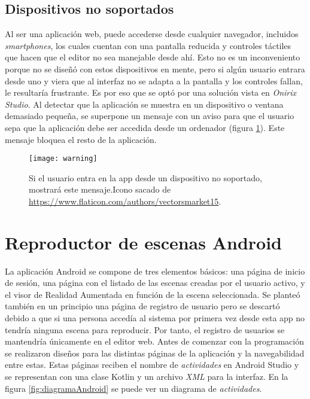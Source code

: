 \subsection{Dispositivos no soportados}

Al ser una aplicación web, puede accederse desde cualquier navegador, incluidos \textit{smartphones}, los cuales cuentan con una pantalla reducida y controles táctiles que hacen que el editor no sea manejable desde ahí. Esto no es un inconveniento porque no se diseñó con estos dispositivos en mente, pero si algún usuario entrara desde uno y viera que al interfaz no se adapta a la pantalla y los controles fallan, le resultaría frustrante. Es por eso que se optó por una solución vista en \textit{Onirix Studio}\cite{onirix}. Al detectar que la aplicación se muestra en un dispositivo o ventana demasiado pequeña, se superpone un mensaje con un aviso para que el usuario sepa que la aplicación debe ser accedida desde un ordenador (figura \ref{fig:warning}). Este mensaje bloquea el resto de la aplicación.

\begin{figure}[H]
    \centering
    \texttt{[image: warning]}
    \caption[Mensaje de advertencia para dispositvos no soportados]{Si el usuario entra en la app desde un dispositivo no soportado, mostrará este mensaje.Icono sacado de \url{https://www.flaticon.com/authors/vectorsmarket15}.}
    \label{fig:warning}
\end{figure}


\section{Reproductor de escenas Android}

La aplicación Android se compone de tres elementos básicos: una página de inicio de sesión, una página con el listado de las escenas creadas por el usuario activo, y el visor de Realidad Aumentada en función de la escena seleccionada. Se planteó también en un principio una página de registro de usuario pero se descartó debido a que si una persona accedía al sistema por primera vez desde esta app no tendría ninguna escena para reproducir. Por tanto, el registro de usuarios se mantendría únicamente en el editor web. Antes de comenzar con la programación se realizaron diseños para las distintas páginas de la aplicación y la navegabilidad entre estas. Estas páginas reciben el nombre de \textit{actividades} en Android Studio y se representan con una clase Kotlin y un archivo \textit{XML} para la interfaz. En la figura \ref{fig:diagramaAndroid} se puede ver un diagrama de \textit{actividades}.

